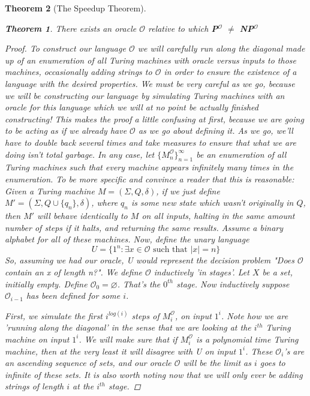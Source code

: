 \documentclass{article}
\theoremstyle{definition}
\theoremstyle{plain}
\theoremstyle{theorem}
\newtheorem{theorem}{Theorem}[section]
\begin{document}
\begin{theorem}[The Speedup Theorem]
\begin{theorem}
    There exists an oracle $\mathcal{O}$ relative to which \textbf{P$^{\mathcal{O}}$} $\neq$ \textbf{NP}$^{\mathcal{O}}$ 
\end{theorem}
\begin{proof}
    To construct our language $\mathcal{O}$ we will carefully run along the diagonal made up of an enumeration of all Turing machines with oracle versus inputs to those machines, occasionally adding strings to $\mathcal{O}$ in order to ensure the existence of a language with the desired properties. We must be very careful as we go, because we will be constructing our language by simulating Turing machines with an oracle for this language which we will at no point be actually finished constructing! This makes the proof a little confusing at first, because we are going to be acting as if we already have $\mathcal{O}$ as we go about defining it. As we go, we'll have to double back several times and take measures to ensure that what we are doing isn't total garbage. In any case, let $\{M_n^{\mathcal{O}}\}_{n=1}^\infty$ be an enumeration of all Turing machines such that every machine appears infinitely many times in the enumeration. To be more specific and convince a reader that this is reasonable: Given a Turing machine $M=(\Sigma,Q,\delta)$, if we just define $M'=(\Sigma,Q\cup \{q_n\},\delta)$, where $q_n$ is some new state which wasn't originally in $Q$, then $M'$ will behave identically to $M$ on all inputs, halting in the same amount number of steps if it halts, and returning the same results. Assume a binary alphabet for all of these machines. Now, define the unary language 
    \[U = \{1^n: \exists x \in \mathcal{O} \textrm{ such that } |x| = n \} \]
    So, assuming we had our oracle, U would represent the decision problem "Does $\mathcal{O}$ contain an x of length n?". We define $\mathcal{O}$ inductively 'in stages'. Let $X$ be a set, initially empty. Define $\mathcal{O}_0 = \varnothing$. That's the $0^{th}$ stage. Now inductively suppose $\mathcal{O}_{i-1}$ has been defined for some $i$. 
    \par First, we simulate the first $i^{log(i)}$ steps of $M_{i}^{\mathcal{O}}$, on input $1^i$. Note how we are 'running along the diagonal' in the sense that we are looking at the $i^{th}$ Turing machine on input $1^i$. We will make sure that if $M_i^{\mathcal{O}}$ is a polynomial time Turing machine, then at the very least it will disagree with U on input $1^i$. These $\mathcal{O}_i$'s are an ascending sequence of sets, and our oracle $\mathcal{O}$ will be the limit as $i$ goes to infinite of these sets. It is also worth noting now that we will only ever be adding strings of length $i$ at the $i^{th}$ stage. 

\end{proof}
\end{theorem}
\end{document}
